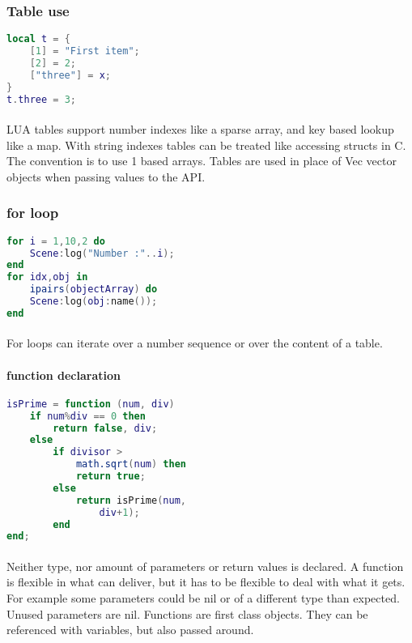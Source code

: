 \subsubsection{Table use}
\begin{lstlisting}[language=lua]
local t = {
    [1] = "First item";
    [2] = 2;
    ["three"] = x;
}
t.three = 3;
\end{lstlisting}

\paragraph{}
LUA tables support number indexes like a sparse array, and key based lookup like a map.
With string indexes tables can be treated like accessing structs in C.
The convention is to use 1 based arrays.
Tables are used in place of Vec vector objects when passing values to the API.

\subsubsection{for loop}
\begin{lstlisting}[language=lua]
for i = 1,10,2 do
    Scene:log("Number :"..i);
end
for idx,obj in
    ipairs(objectArray) do
    Scene:log(obj:name());
end
\end{lstlisting}

\paragraph{}
For loops can iterate over a number sequence or over the content of a table.

\paragraph{function declaration}
\begin{lstlisting}[language=lua]
isPrime = function (num, div)
    if num%div == 0 then
        return false, div;
    else
        if divisor >
            math.sqrt(num) then
            return true;
        else
            return isPrime(num,
                div+1);
        end
end;
\end{lstlisting}

\paragraph{}
Neither type, nor amount of parameters or return values is declared.
A function is flexible in what can deliver, but it has to be flexible to deal with what it gets.
For example some parameters could be nil or of a different type than expected.
Unused parameters are nil.
Functions are first class objects. They can be referenced with variables, but also passed around.


